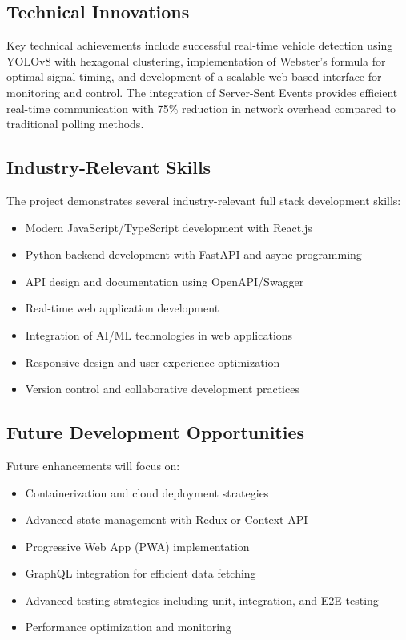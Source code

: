 \documentclass[conference]{IEEEtran}
\begin{document}
\subsection{Technical Innovations}

Key technical achievements include successful real-time vehicle detection using YOLOv8 with hexagonal clustering, implementation of Webster's formula for optimal signal timing, and development of a scalable web-based interface for monitoring and control. The integration of Server-Sent Events provides efficient real-time communication with 75\% reduction in network overhead compared to traditional polling methods.

\subsection{Industry-Relevant Skills}

The project demonstrates several industry-relevant full stack development skills:
\begin{itemize}
\item Modern JavaScript/TypeScript development with React.js
\item Python backend development with FastAPI and async programming
\item API design and documentation using OpenAPI/Swagger
\item Real-time web application development
\item Integration of AI/ML technologies in web applications
\item Responsive design and user experience optimization
\item Version control and collaborative development practices
\end{itemize}

\subsection{Future Development Opportunities}

Future enhancements will focus on:
\begin{itemize}
\item Containerization and cloud deployment strategies
\item Advanced state management with Redux or Context API
\item Progressive Web App (PWA) implementation
\item GraphQL integration for efficient data fetching
\item Advanced testing strategies including unit, integration, and E2E testing
\item Performance optimization and monitoring
\end{itemize}
\end{document}
